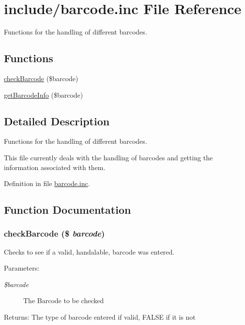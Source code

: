 \hypertarget{barcode_8inc}{
\section{include/barcode.inc File Reference}
\label{barcode_8inc}
}
Functions for the handling of different barcodes. 

\subsection*{Functions}
\begin{CompactItemize}
\item 
\hyperlink{barcode_8inc_6d3645af0ef526e4f64d28dcbdceb74f}{checkBarcode} (\$barcode)
\item 
\hyperlink{barcode_8inc_e10c37e4f9f9b7c6617a388351a27c99}{getBarcodeInfo} (\$barcode)
\end{CompactItemize}


\subsection{Detailed Description}
Functions for the handling of different barcodes. 

This file currently deals with the handling of barcodes and getting the information associated with them. 

Definition in file \hyperlink{barcode_8inc-source}{barcode.inc}.

\subsection{Function Documentation}
\hypertarget{barcode_8inc_6d3645af0ef526e4f64d28dcbdceb74f}{
\subsubsection{\setlength{\rightskip}{0pt plus 5cm}checkBarcode (\$ {\em barcode})}}
\label{barcode_8inc_6d3645af0ef526e4f64d28dcbdceb74f}


Checks to see if a valid, handalable, barcode was entered. \begin{Desc}
\item[Parameters:]
\begin{description}
\item[{\em \$barcode}]The Barcode to be checked \end{description}
\end{Desc}
\begin{Desc}
\item[Returns:]The type of barcode entered if valid, FALSE if it is not \end{Desc}


